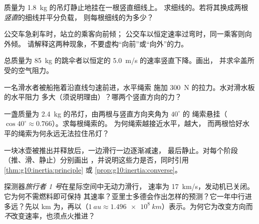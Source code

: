 \begin{exercise}[$\star\star$]\label{exo:g10:inertia:8}
质量为 \qty{1.8}{kg} 的吊灯静止地挂在一根竖直细线上。
求细线的。若将其换成两根
\emph{竖直}的细线并平分负载，
则每根细线的为多少？
\end{exercise}

\begin{exercise}[$\star\star$]\label{exo:g10:inertia:9}
公交车急刹车时，站立的乘客向前倾；
公交车以恒定速率过弯时，同一乘客则向外倾。
请解释这两种现象，不要虚构“向前”或“向外”的力。
\end{exercise}

\begin{exercise}[$\star\star$]\label{exo:g10:inertia:10}
总质量为 \qty{85}{kg} 的跳伞者以恒定的
\qty{5.0}{m/s} 的速率竖直下降。画出，
并求伞盖所受的空气阻力。
\end{exercise}

\begin{exercise}[$\star\star$]\label{exo:g10:inertia:11}
一名滑水者被船拖着沿直线匀速前进，水平绳索
施加 \qty{300}{N} 的拉力。水对滑水板的水平阻力
多大（须说明理由）？哪两个竖直方向的力？
\end{exercise}

\begin{exercise}[$\star\star\star$]\label{exo:g10:inertia:12}
一盏质量为 \qty{2.4}{kg} 的吊灯，由两根与竖直方向夹角为 $40^\circ$ 的
绳索悬挂（$\cos 40^\circ \approx 0.766$）。求每根绳索的。
为何绳索越接近水平，越大，
而两根恰好水平的绳索为何永远无法拉住吊灯？
\end{exercise}

\begin{exercise}[$\star\star\star$]\label{exo:g10:inertia:13}
一块冰壶被推出并释放后，一边滑行一边逐渐减速，
最后静止。对每个阶段（推、滑、静止）分别画出
，并说明这些力是否，同时引用
\cref{thm:g10:inertia:principle} 或 \cref{prop:g10:inertia:converse}。
\end{exercise}

\begin{exercise}[$\star\star\star$]\label{exo:g10:inertia:14}
探测器\emph{旅行者 1 号}在星际空间中无动力滑行，
速率为 \qty{17}{km/s}，发动机已关闭。它为何不需燃料即可保持
其速率？亚里士多德会作出怎样的预测？它一年中行进
多远？先以 \unit{km} 为，再以（$\qty{1}{au} \approx
\qty{1.496e8}{km}$）表示。为何它为改变方向而
\emph{不}改变速率，也须点火推进？
\end{exercise}

